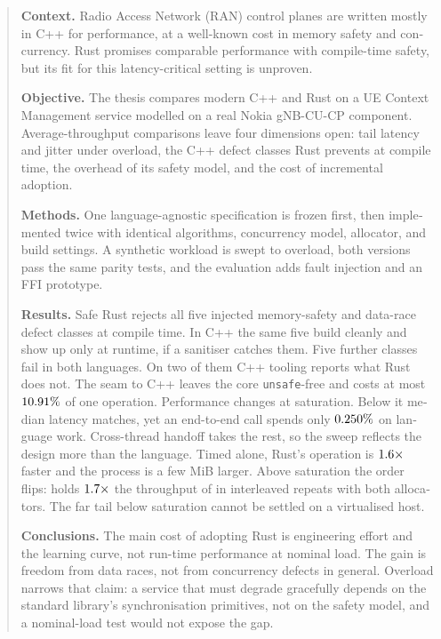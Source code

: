 \documentclass[english,oneside,a4paper,censored,csm,software-track-2020]{HYthesisML}
\begin{document}
{\singlespacing
\begin{otherlanguage}{english}
\begin{abstract}
\noindent\textbf{Context.}
Radio Access Network (RAN) control planes are written mostly in C++ for performance, at a
well-known cost in memory safety and concurrency. Rust promises comparable performance with
compile-time safety, but its fit for this latency-critical setting is unproven.

\noindent\textbf{Objective.}
The thesis compares modern C++ and Rust on a UE Context Management service modelled on a real
Nokia gNB-CU-CP component. Average-throughput comparisons leave four dimensions open: tail latency
and jitter under overload, the C++ defect classes Rust prevents at compile time, the overhead of
its safety model, and the cost of incremental adoption.

\noindent\textbf{Methods.}
One language-agnostic specification is frozen first, then implemented twice with identical
algorithms, concurrency model, allocator, and build settings. A synthetic workload is swept to
overload, both versions pass the same parity tests, and the evaluation adds fault injection and an
FFI prototype.

\noindent\textbf{Results.}
Safe Rust rejects all five injected memory-safety and data-race defect classes at compile
time. In C++ the same five build cleanly and show up only at runtime, if a sanitiser catches
them. Five further classes fail in both languages. On two of them C++ tooling reports what
Rust does not. The seam to C++ leaves the core \texttt{unsafe}-free and costs at most
$\FfiOpBoundPct\%$ of one operation. Performance changes at saturation. Below it median
latency matches, yet an end-to-end call spends only $\BudgetCoreShareMax\%$ on language
work. Cross-thread handoff takes the rest, so the sweep reflects the design more than the
language. Timed alone, Rust's operation is $\BudgetCoreRatio\times$ faster and the process
is a few MiB larger. Above saturation the order flips: \OverloadSustainedFaster{} holds
$\OverloadThrRatio\times$ the throughput of \OverloadSustainedSlower{} in \OverloadThrAgree{}
interleaved repeats with both allocators. The far tail below saturation cannot be settled
on a virtualised host.

\noindent\textbf{Conclusions.}
The main cost of adopting Rust is engineering effort and the learning curve, not run-time
performance at nominal load. The gain is freedom from data races, not from concurrency
defects in general. Overload narrows that claim: a service that must degrade gracefully
depends on the standard library's synchronisation primitives, not on the safety model, and
a nominal-load test would not expose the gap.
\end{abstract}
\end{otherlanguage}
}
\end{document}
